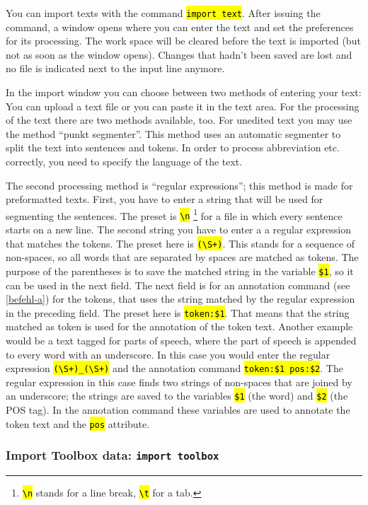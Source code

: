 \documentclass[12pt]{scrartcl}
\newcommand{\code}[1]{\hl{\texttt{#1}}}
\begin{document}
You can import texts with the command \code{import text}. After issuing the command, a window opens where you can enter the text and set the preferences for its processing.
The work space will be cleared before the text is imported (but not as soon as the window opens).
Changes that hadn’t been saved are lost and no file is indicated next to the input line anymore.

In the import window you can choose between two methods of entering your text:
You can upload a text file or you can paste it in the text area.
For the processing of the text there are two methods available, too.
For unedited text you may use the method “punkt segmenter”.
This method uses an automatic segmenter to split the text into sentences and tokens.
In order to process abbreviation etc. correctly, you need to specify the language of the text.

The second processing method is “regular expressions”; this method is made for preformatted texts.
First, you have to enter a string that will be used for segmenting the sentences.
The preset is \code{{\textbackslash}n} \footnote{\code{{\textbackslash}n} stands for a line break, \code{{\textbackslash}t} for a tab.} for a file in which every sentence starts on a new line.
The second string you have to enter a a regular expression that matches the tokens.
The preset here is \code{({\textbackslash}S+)}.
This stands for a sequence of non-spaces, so all words that are separated by spaces are matched as tokens.
The purpose of the parentheses is to save the matched string in the variable \code{\$1}, so it can be used in the next field.
The next field is for an annotation command (see \ref{befehl-a}) for the tokens, that uses the string matched by the regular expression in the preceding field.
The preset here is \code{token:\$1}.
That means that the string matched as token is used for the annotation of the token text.
Another example would be a text tagged for parts of speech, where the part of speech is appended to every word with an underscore.
In this case you would enter the regular expression \code{({\textbackslash}S+)\_({\textbackslash}S+)} and the annotation command \code{token:\$1 pos:\$2}.
The regular expression in this case finds two strings of non-spaces that are joined by an underscore; the strings are saved to the variables \code{\$1} (the word) and \code{\$2} (the POS tag).
In the annotation command these variables are used to annotate the token text and the \code{pos} attribute.


\subsubsection{Import Toolbox data: \texttt{import toolbox}}
\end{document}
